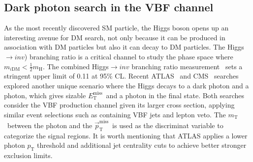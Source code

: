 \documentclass{moriond}
\def\mt{m_{\textrm{T}}}
\def\et{E_\textrm{T}^{\textrm{miss}}}
\def\ptmiss{\vec{p}_\textrm{T}^{\textrm{miss}}}
\begin{document}
\subsection{Dark photon search in the VBF channel}

As the most recently discovered SM particle, the Higgs boson opens up an
interesting avenue for DM search, not only because it can be produced in
association with DM particles but also it can decay to DM particles. The
Higgs$\rightarrow inv$) branching ratio is a critical channel to study the
phase space where $m_{i\textrm{DM}} < \frac{1}{2}m_{\textrm{H}}$. The combined
Higgs$\rightarrow inv$ branching ratio measurement~\cite{hiv} sets a stringent upper limit
of 0.11 at 95\% CL. Recent ATLAS~\cite{atlasvbf} and CMS~\cite{cmsvbf} searches explored another unique
scenario where the Higgs decays to a dark photon and a photon, which gives
sizable $\et$\ and a photon in the final state. Both searches consider the VBF
production channel given its larger cross section, applying similar event
selections such as containing VBF jets and lepton veto. The $\mt$\ between the
photon and the $\ptmiss$\ is used as the discriminat variable to categorize the
signal regions. It is worth mentioning that ATLAS applies a lower photon
$p_{\textrm{T}}$ threshold and additional jet centrality cuts to achieve better
stronger exclusion limits.  
\end{document}
